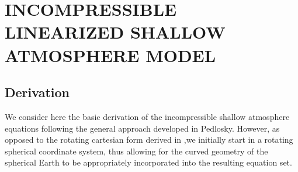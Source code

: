 
\chapter[INCOMPRESSIBLE LINEARIZED SHALLOW ATMOSPHERE MODEL]{INCOMPRESSIBLE LINEARIZED SHALLOW ATMOSPHERE MODEL}
\label{chap:2}
\section{Derivation} \label{sec:incompderiv}
We consider here the basic derivation of the incompressible shallow atmosphere equations following the general approach developed in Pedlosky\cite[pages 57--63]{Pedlosky:GFD}. However, as opposed to the rotating cartesian form derived in \cite{Pedlosky:GFD},we initially start in a rotating spherical coordinate system, thus allowing for the curved geometry of the spherical Earth to be appropriately incorporated into the resulting equation set. 

